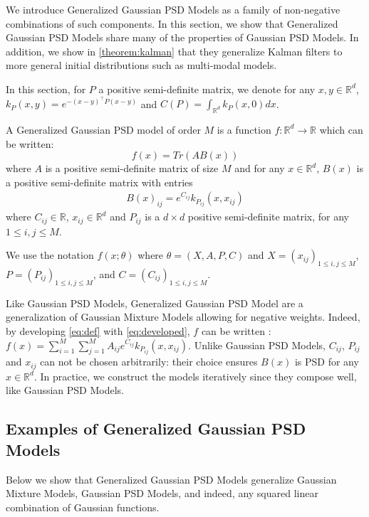 We introduce Generalized Gaussian PSD Models as a family of non-negative combinations of such components. In this section, we show that Generalized Gaussian PSD Models share many of the properties of Gaussian PSD Models. In addition, we show in \cref{theorem:kalman} that they generalize Kalman filters to more general initial distributions such as multi-modal models.

In this section, for $P$ a positive semi-definite matrix, we denote for any $x, y\in\mathbb R^d$, $k_P(x, y) = e^{-(x-y)^\top  P(x-y)}$ and $C(P) = \int_{\mathbb R^d} k_P(x, 0)dx$.

\begin{definition}\label{definition:ggpsd}
A Generalized Gaussian PSD model of order $M$ is a function $f: \mathbb R^d \to\mathbb R$ which can be written:
\begin{equation}\label{eq:def}
    f(x) = Tr(AB(x))%
\end{equation}
where $A$ is a positive semi-definite matrix of size $M$ and for any $x\in\mathbb R^d$, $B(x)$ is a positive semi-definite matrix with entries
\begin{align}\label{eq:developed}
    B(x)_{ij}=e^{C_{ij}}k_{P_{ij}}(x, x_{ij})
\end{align}
where $C_{ij} \in \mathbb R$, $x_{ij}\in\mathbb R^d$ and $P_{ij}$ is a $d\times d$ positive semi-definite matrix, for any $1\leq i,j\leq M$.
\end{definition}
We use the notation $f(x; \theta)$ where $\theta = (X, A, P, C)$ and $X = (x_{ij})_{1 \leq i,j\leq M}$, $P=(P_{ij})_{1 \leq i,j\leq M}$, and $C=(C_{ij})_{1 \leq i,j\leq M}$.

Like Gaussian PSD Models, Generalized Gaussian PSD Model are a generalization of Gaussian Mixture Models allowing for negative weights. Indeed, by developing \cref{eq:def} with \cref{eq:developed}, $f$ can be written :  $f(x) = \sum_{i=1}^M\sum_{j=1}^M A_{ij}e^{C_{ij}}k_{P_{ij}}(x, x_{ij})$. Unlike Gaussian PSD Models, $C_{ij}$, $P_{ij}$ and $x_{ij}$ can not be chosen arbitrarily: their choice ensures $B(x)$ is PSD for any $x\in\mathbb R^d$. In practice, we construct the models iteratively since they compose well, like Gaussian PSD Models.

\subsection{Examples of Generalized Gaussian PSD Models}
Below we show that Generalized Gaussian PSD Models generalize Gaussian Mixture Models, Gaussian PSD Models, and indeed, any squared linear combination of Gaussian functions.

